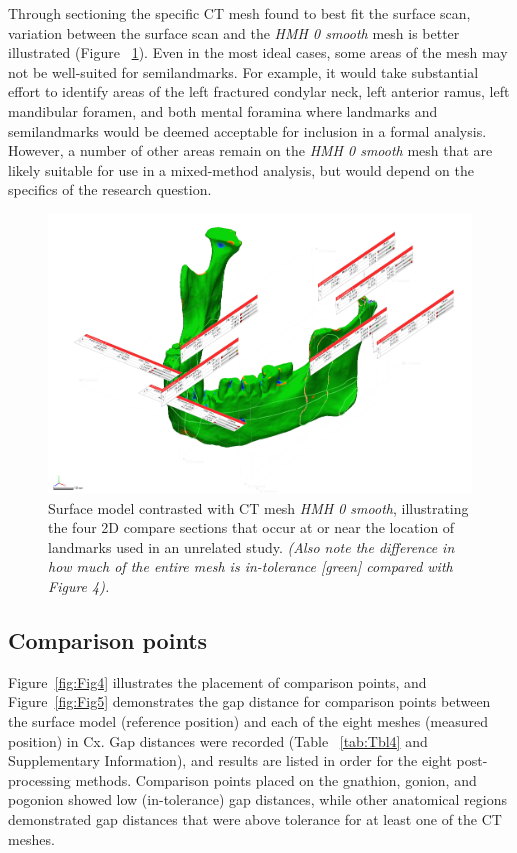 \documentclass[review]{elsarticle}
\begin{document}
Through sectioning the specific CT mesh found to best fit the surface scan, variation between the surface scan and the \textit{HMH 0 smooth} mesh is better illustrated (Figure ~\ref{fig:Fig6}). Even in the most ideal cases, some areas of the mesh may not be well-suited for semilandmarks. For example, it would take substantial effort to identify areas of the left fractured condylar neck, left anterior ramus, left mandibular foramen, and both mental foramina where landmarks and semilandmarks would be deemed acceptable for inclusion in a formal analysis. However, a number of other areas remain on the \textit{HMH 0 smooth} mesh that are likely suitable for use in a mixed-method analysis, but would depend on the specifics of the research question.

\begin{figure}[ht]\centering
\includegraphics[width=\linewidth]{Fig6}
\caption{Surface model contrasted with CT mesh \textit{HMH 0 smooth}, illustrating the four 2D compare sections that occur at or near the location of landmarks used in an unrelated study. \textit{(Also note the difference in how much of the entire mesh is in-tolerance [green] compared with Figure 4).}}
\label{fig:Fig6}
\end{figure}

\subsection{Comparison points}
Figure~\ref{fig:Fig4} illustrates the placement of comparison points, and Figure~\ref{fig:Fig5} demonstrates the gap distance for comparison points between the surface model (reference position) and each of the eight meshes (measured position) in Cx. Gap distances were recorded (Table ~\ref{tab:Tbl4} and Supplementary Information), and results are listed in order for the eight post-processing methods. Comparison points placed on the gnathion, gonion, and pogonion showed low (in-tolerance) gap distances, while other anatomical regions demonstrated gap distances that were above tolerance for at least one of the CT meshes.
\end{document}
